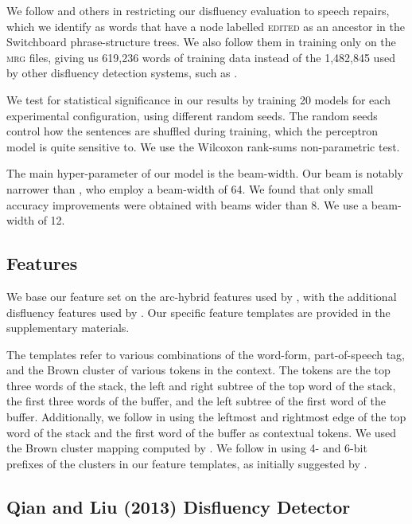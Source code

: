 \documentclass[11pt,letterpaper]{article}
\begin{document}
We follow \citet{Johnson04a} and others in restricting our disfluency evaluation
to speech repairs, which we identify as words that have a node labelled \textsc{edited}
as an ancestor in the Switchboard phrase-structure trees.  We also follow them
in training only on the \textsc{mrg} files, giving us 619,236 words of training
data instead of the 1,482,845 used by other disfluency detection systems, such
as \citet{qian:13}.

We test for statistical significance in our results by training 20 models for
each experimental configuration, using different random seeds. The random seeds
control how the sentences are shuffled during training, which the perceptron
model is quite sensitive to.  We use the Wilcoxon rank-sums non-parametric test.

The main hyper-parameter of our model is the beam-width.
Our beam is notably narrower than \citet{honnibal:14}, who employ a beam-width
of 64. We found that
only small accuracy improvements were obtained with beams wider than 8.
We use a beam-width of 12.

\subsection{Features}

We base our feature set on the arc-hybrid features used by
\citet{goldberg:13},
with the additional disfluency features used by \citet{honnibal:14}.  Our
specific feature templates are provided in the supplementary materials.

The templates refer to various combinations of the word-form, part-of-speech tag,
and the Brown cluster \citep{brown:92} of various tokens
in the context.  The tokens are the top three words of the stack, the left and
right subtree of the top word of the stack, the first three words of the buffer,
and the left subtree of the first word of the buffer.  Additionally, we follow
\citet{honnibal:14} in using the leftmost and rightmost edge of the top word
of the stack and the first word of the buffer as contextual tokens.
We used the Brown cluster mapping computed by \citet{liang:05}.
We follow \citet{honnibal:14}
in using 4- and 6-bit prefixes of the clusters in our feature templates, as
initially suggested by \citet{koo:10}.

\subsection{Qian and Liu (2013) Disfluency Detector}
\end{document}

